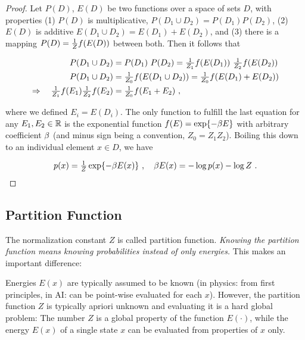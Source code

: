 {\small

\begin{proof}
Let $P(D)$, $E(D)$ be two functions over a space of sets $D$, with 
properties (1) $P(D)$ is multiplicative, $P(D_1 \cup D_2) = P(D_1)
P(D_2)$, (2) $E(D)$ is additive $E(D_1\cup D_2) = E(D_1) + E(D_2)$,
and (3) there is a mapping $P(D) = \textstyle\frac 1Z f(E(D))$ between both. Then it follows that

\begin{align}
P(D_1\cup D_2)
&= P(D_1)~ P(D_2) = \textstyle\frac 1{Z_1} f(E(D_1))~ \textstyle\frac 1{Z_2} f(E(D_2)) \\
P(D_1\cup D_2)
&= \textstyle\frac 1{Z_0} f(E(D_1\cup D_2)) = \textstyle\frac 1{Z_0} f(E(D_1) + E(D_2)) \\
\Rightarrow\quad \textstyle\frac 1{Z_1} f(E_1) \textstyle\frac 1{Z_2} f(E_2)
&= \textstyle\frac 1{Z_0} f(E_1+E_2) ~, \label{exp}
\end{align}

where we defined $E_i=E(D_i)$. The only function to fulfill
the last equation for any $E_1,E_2\in{\mathbb{R}}$ is the exponential function $f(E) = \exp\lbrace -\beta E \rbrace$ with arbitrary
 coefficient $\beta$ (and minus sign being a convention, $Z_0 = Z_1
 Z_2$). Boiling this down to an individual element $x\in D$, we have

\begin{align}
p(x) = \textstyle\frac 1Z \exp\lbrace-\beta E(x)\rbrace ~,\quad \beta E(x) = -\log p(x) - \log Z ~.
\end{align}

\end{proof}

}


\subsection{Partition Function}

The normalization constant $Z$ is called partition function. 
\emph{Knowing the partition function means knowing probabilities instead of only energies.} This makes an important difference:

Energies $E(x)$ are typically assumed to be known (in physics: from
first principles, in AI: can be point-wise evaluated for each
$x$). However, the partition function $Z$ is typically apriori unknown
and evaluating it is a hard global problem: The number $Z$ is a global
property of the function $E(\cdot)$, while the energy $E(x)$ of a
single state $x$ can be evaluated from properties of $x$
only.

